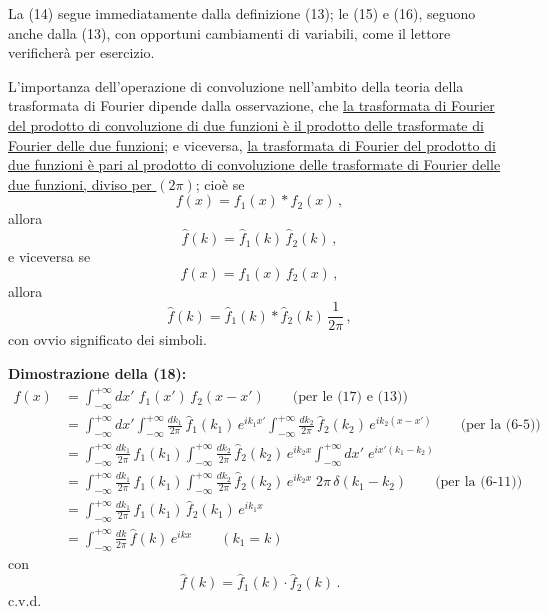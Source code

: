 \documentclass[11pt, a4paper]{book}
\numberwithin{equation}{section}
\begin{document}
La (14) segue immediatamente dalla definizione (13); le (15) e (16), seguono anche dalla (13), con opportuni cambiamenti di variabili, come il lettore verificherà per esercizio.

L'importanza dell'operazione di convoluzione nell'ambito della teoria della trasformata di Fourier dipende dalla osservazione, che \uline{la trasformata di Fourier del prodotto di convoluzione di due funzioni è il prodotto delle trasformate di Fourier delle due funzioni}; e viceversa, \uline{la trasformata di Fourier del prodotto di due funzioni è pari al prodotto di convoluzione delle trasformate di Fourier delle due funzioni, diviso per $(2\pi)$}; cioè se
\begin{equation}
  f(x) = f_1(x)*f_2(x)\,, \tag{17}
\end{equation}
allora
\begin{equation}
  \hat{f}(k) = \hat{f}_1(k)\,\hat{f}_2(k)\,, \tag{18}
\end{equation}
e viceversa se
\begin{equation}
  f(x) = f_1(x)\,f_2(x)\,, \tag{19}
\end{equation}
allora
\begin{equation}
  \hat{f}(k) = \hat{f}_1(k)*\hat{f}_2(k)\,\frac{1}{2\pi}\,, \tag{20}
\end{equation}
con ovvio significato dei simboli.

\textbf{Dimostrazione della (18):}
\begin{align*}
  f(x) &= \int_{-\infty}^{+\infty} dx'\;f_1(x')\,f_2(x-x')
    \qquad\text{(per le (17) e (13))}\\
  &= \int_{-\infty}^{+\infty} dx'\int_{-\infty}^{+\infty}\frac{dk_1}{2\pi}\,
    \hat{f}_1(k_1)\,e^{ik_1 x'}
    \int_{-\infty}^{+\infty}\frac{dk_2}{2\pi}\,\hat{f}_2(k_2)\,e^{ik_2(x-x')}
    \qquad\text{(per la (6-5))}\\
  &= \int_{-\infty}^{+\infty}\frac{dk_1}{2\pi}\,\hat{f}_1(k_1)
    \int_{-\infty}^{+\infty}\frac{dk_2}{2\pi}\,\hat{f}_2(k_2)\,e^{ik_2 x}
    \int_{-\infty}^{+\infty} dx'\;e^{ix'(k_1-k_2)}\\
  &= \int_{-\infty}^{+\infty}\frac{dk_1}{2\pi}\,\hat{f}_1(k_1)
    \int_{-\infty}^{+\infty}\frac{dk_2}{2\pi}\,\hat{f}_2(k_2)\,e^{ik_2 x}\;
    2\pi\,\delta(k_1-k_2)
    \qquad\text{(per la (6-11))}\\
  &= \int_{-\infty}^{+\infty}\frac{dk_1}{2\pi}\,\hat{f}_1(k_1)\,\hat{f}_2(k_1)\,e^{ik_1 x}\\
  &= \int_{-\infty}^{+\infty}\frac{dk}{2\pi}\,\hat{f}(k)\,e^{ikx}
    \qquad(k_1=k)
\end{align*}
con
\[
  \hat{f}(k) = \hat{f}_1(k)\cdot\hat{f}_2(k)\,.
\]
c.v.d.
\end{document}
